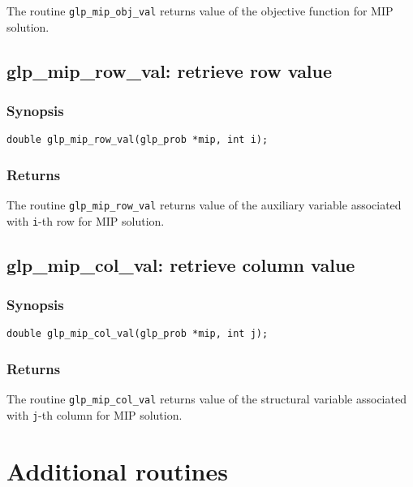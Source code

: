 The routine \verb|glp_mip_obj_val| returns value of the objective
function for MIP solution.

\subsection{glp\_mip\_row\_val: retrieve row value}

\subsubsection*{Synopsis}

\begin{verbatim}
double glp_mip_row_val(glp_prob *mip, int i);
\end{verbatim}

\subsubsection*{Returns}

The routine \verb|glp_mip_row_val| returns value of the auxiliary
variable associated with \verb|i|-th row for MIP solution.

\subsection{glp\_mip\_col\_val: retrieve column value}

\subsubsection*{Synopsis}

\begin{verbatim}
double glp_mip_col_val(glp_prob *mip, int j);
\end{verbatim}

\subsubsection*{Returns}

The routine \verb|glp_mip_col_val| returns value of the structural
variable associated with \verb|j|-th column for MIP solution.


\newpage

\section{Additional routines}


